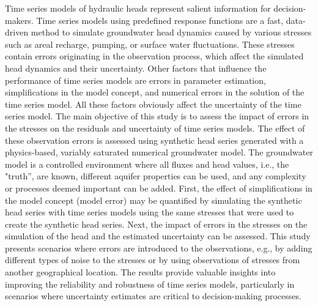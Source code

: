 Time series models of hydraulic heads represent salient information for decision-makers. Time series models using predefined response functions are a fast, data-driven method to simulate groundwater head dynamics caused by various stresses such as areal recharge, pumping, or surface water fluctuations. These stresses contain errors originating in the observation process, which affect the simulated head dynamics and their uncertainty. Other factors that influence the performance of time series models are errors in parameter estimation, simplifications in the model concept, and numerical errors in the solution of the time series model. All these factors obviously affect the uncertainty of the time series model. The main objective of this study is to assess the impact of errors in the stresses on the residuals and uncertainty of time series models. The effect of these observation errors is assessed using synthetic head series generated with a physics-based, variably saturated numerical groundwater model. The groundwater model is a controlled environment where all fluxes and head values, i.e., the "truth'', are known, different aquifer properties can be used, and any complexity or processes deemed important can be added. First, the effect of simplifications in the model concept (model error) may be quantified by simulating the synthetic head series with time series models using the same stresses that were used to create the synthetic head series. Next, the impact of errors in the stresses on the simulation of the head and the estimated uncertainty can be assessed. This study presents scenarios where errors are introduced to the observations, e.g., by adding different types of noise to the stresses or by using observations of stresses from another geographical location. The results provide valuable insights into improving the reliability and robustness of time series models, particularly in scenarios where uncertainty estimates are critical to decision-making processes.